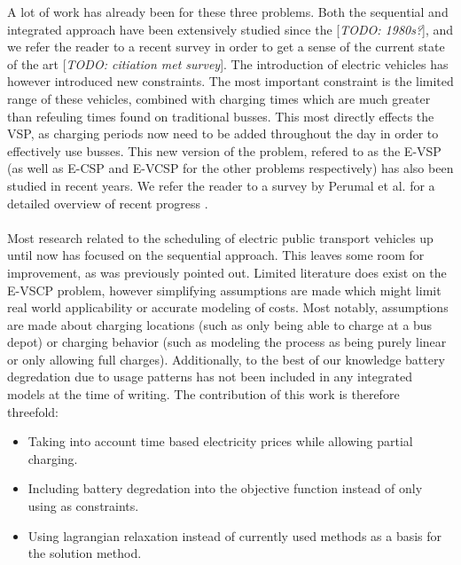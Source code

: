 \documentclass[ht]{article}
\newcommand{\todo}[1]{{\color{red}[\textit{TODO: #1}]}}
\begin{document}
A lot of work has already been for these three problems. Both the sequential and integrated approach have been extensively studied since the \todo{1980s?}, and we refer the reader to a recent survey in order to get a sense of the current state of the art \todo{citiation met survey}. The introduction of electric vehicles has however introduced new constraints. The most important constraint is the limited range of these vehicles, combined with charging times which are much greater than refeuling times found on traditional busses. This most directly effects the VSP, as charging periods now need to be added throughout the day in order to effectively use busses. This new version of the problem, refered to as the E-VSP (as well as E-CSP and E-VCSP for the other problems respectively) has also been studied in recent years. We refer the reader to a survey by Perumal et al. for a detailed overview of recent progress \cite{Perumal2022LitRev}. \\\\
Most research related to the scheduling of electric public transport vehicles up until now has focused on the sequential approach. This leaves some room for improvement, as was previously pointed out. Limited literature does exist on the E-VSCP problem, however simplifying assumptions are made which might limit real world applicability or accurate modeling of costs. Most notably, assumptions are made about charging locations (such as only being able to charge at a bus depot) or charging behavior (such as modeling the process as being purely linear or only allowing full charges). Additionally, to the best of our knowledge battery degredation due to usage patterns has not been included in any integrated models at the time of writing. The contribution of this work is therefore threefold: 
\begin{itemize}
  \item Taking into account time based electricity prices while allowing partial charging. 
  \item Including battery degredation into the objective function instead of only using as constraints.
  \item Using lagrangian relaxation instead of currently used methods as a basis for the solution method. 
\end{itemize}
\end{document}
